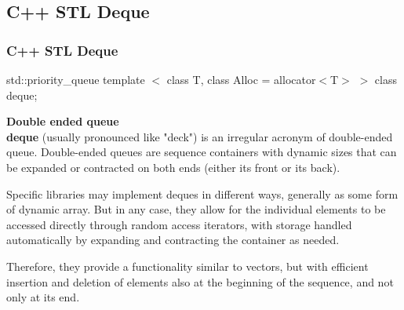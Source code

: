 \documentclass{beamer}
\begin{document}
\subsection{C++ STL Deque} 

\begin{frame}
\frametitle{C++ STL Deque}

\begin{block}{std::priority\_queue}
template $<$ class T, class Alloc = allocator$<$T$>$ $>$ class deque;
\end{block}

\textbf{Double ended queue}\\

\textbf{deque} (usually pronounced like "deck") is an irregular acronym of double-ended queue. Double-ended queues are sequence containers with dynamic sizes that can be expanded or contracted on both ends (either its front or its back).

Specific libraries may implement deques in different ways, generally as some form of dynamic array. But in any case, they allow for the individual elements to be accessed directly through random access iterators, with storage handled automatically by expanding and contracting the container as needed.

Therefore, they provide a functionality similar to vectors, but with efficient insertion and deletion of elements also at the beginning of the sequence, and not only at its end. 

\end{frame}
\end{document}
